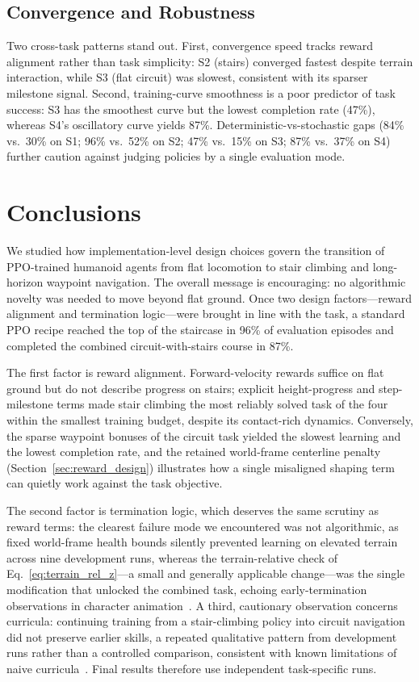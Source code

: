 \documentclass[conference,a4paper]{IEEEtran}
\begin{document}
\subsection{Convergence and Robustness}
Two cross-task patterns stand out. First, convergence speed tracks reward alignment rather than task simplicity: S2 (stairs) converged fastest despite terrain interaction, while S3 (flat circuit) was slowest, consistent with its sparser milestone signal. Second, training-curve smoothness is a poor predictor of task success: S3 has the smoothest curve but the lowest completion rate (47\%), whereas S4's oscillatory curve yields 87\%. Deterministic-vs-stochastic gaps (84\% vs.\ 30\% on S1; 96\% vs.\ 52\% on S2; 47\% vs.\ 15\% on S3; 87\% vs.\ 37\% on S4) further caution against judging policies by a single evaluation mode.

\section{Conclusions}
\label{sec:conclusion}

We studied how implementation-level design choices govern the transition of PPO-trained humanoid agents from flat locomotion to stair climbing and long-horizon waypoint navigation. The overall message is encouraging: no algorithmic novelty was needed to move beyond flat ground. Once two design factors---reward alignment and termination logic---were brought in line with the task, a standard PPO recipe reached the top of the staircase in 96\% of evaluation episodes and completed the combined circuit-with-stairs course in 87\%.

The first factor is reward alignment. Forward-velocity rewards suffice on flat ground but do not describe progress on stairs; explicit height-progress and step-milestone terms made stair climbing the most reliably solved task of the four within the smallest training budget, despite its contact-rich dynamics. Conversely, the sparse waypoint bonuses of the circuit task yielded the slowest learning and the lowest completion rate, and the retained world-frame centerline penalty (Section~\ref{sec:reward_design}) illustrates how a single misaligned shaping term can quietly work against the task objective.

The second factor is termination logic, which deserves the same scrutiny as reward terms: the clearest failure mode we encountered was not algorithmic, as fixed world-frame health bounds silently prevented learning on elevated terrain across nine development runs, whereas the terrain-relative check of Eq.~\eqref{eq:terrain_rel_z}---a small and generally applicable change---was the single modification that unlocked the combined task, echoing early-termination observations in character animation~\cite{peng2018deepmimic}. A third, cautionary observation concerns curricula: continuing training from a stair-climbing policy into circuit navigation did not preserve earlier skills, a repeated qualitative pattern from development runs rather than a controlled comparison, consistent with known limitations of naive curricula~\cite{bengio2009curriculum}. Final results therefore use independent task-specific runs.
\end{document}
